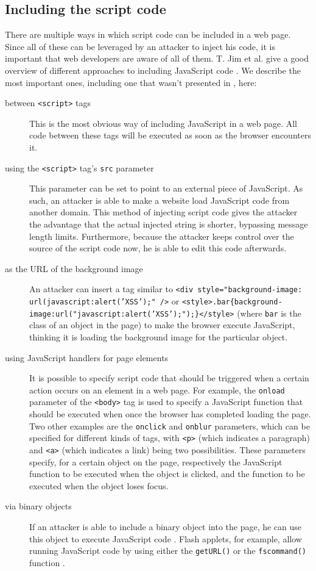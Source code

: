 \subsection{Including the script code}\label{injecting-script}
There are multiple ways in which script code can be included in a web page. Since all of these can be leveraged by an attacker to inject his code, it is important that web developers are aware of all of them. T. Jim et al. give a good overview of different approaches to including JavaScript code \cite{Jim2007}. We describe the most important ones, including one that wasn't presented in \cite{Jim2007}, here:
\begin{description}
	\item[between \texttt{<script>} tags] This is the most obvious way of including JavaScript in a web page. All code between these tags will be executed as soon as the browser encounters it.
	\item[using the \texttt{<script>} tag's \texttt{src} parameter] This parameter can be set to point to an external piece of JavaScript. As such, an attacker is able to make a website load JavaScript code from another domain. This method of injecting script code gives the attacker the advantage that the actual injected string is shorter, bypassing message length limits. Furthermore, because the attacker keeps control over the source of the script code now, he is able to edit this code afterwards.
	\item[as the URL of the background image] An attacker can insert a tag similar to \texttt{<div style="background-image: url(javascript:alert('XSS');" />} or \texttt{<style>.bar\{background-image:url("javascript:alert('XSS');");\}</style>} (where \texttt{bar} is the class of an object in the page) to make the browser execute JavaScript, thinking it is loading the background image for the particular object.
	\item[using JavaScript handlers for page elements] It is possible to specify script code that should be triggered when a certain action occurs on an element in a web page. For example, the \texttt{onload} parameter of the \texttt{<body>} tag is used to specify a JavaScript function that should be executed when once the browser has completed loading the page. Two other examples are the \texttt{onclick} and \texttt{onblur} parameters, which can be specified for different kinds of tags, with \texttt{<p>} (which indicates a paragraph) and \texttt{<a>} (which indicates a link) being two possibilities. These parameters specify, for a certain object on the page, respectively the JavaScript function to be executed when the object is clicked, and the function to be executed when the object loses focus.
	\item[via binary objects] If an attacker is able to include a binary object into the page, he can use this object to execute JavaScript code \cite{Bisht2008}. Flash applets, for example, allow running JavaScript code by using either the \texttt{getURL()} or the \texttt{fscommand()} function \cite{FlashJSattack,FlashJS,FlashCookie}.
\end{description}

